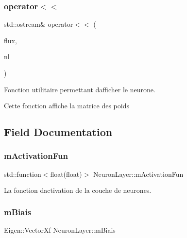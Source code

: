 \subsubsection{\texorpdfstring{operator$<$$<$}{operator<<}}
{\footnotesize\ttfamily std\+::ostream\& operator$<$$<$ (\begin{DoxyParamCaption}\item[{std\+::ostream \&}]{flux,  }\item[{\hyperlink{classNeuronLayer}{Neuron\+Layer}}]{nl }\end{DoxyParamCaption})\hspace{0.3cm}{\ttfamily [friend]}}



Fonction utilitaire permettant d\textquotesingle{}afficher le neurone. 

Cette fonction affiche la matrice des poids 

\subsection{Field Documentation}
\mbox{\label{classNeuronLayer_ac0ff52b79f1a068e75f0eb0309b5e683}} 
\subsubsection{\texorpdfstring{m\+Activation\+Fun}{mActivationFun}}
{\footnotesize\ttfamily std\+::function$<$float(float)$>$ Neuron\+Layer\+::m\+Activation\+Fun\hspace{0.3cm}{\ttfamily [private]}}



La fonction d\textquotesingle{}activation de la couche de neurones. 

\mbox{\label{classNeuronLayer_a6d1c0d70051d87dace0cdf654d866a4a}} 
\subsubsection{\texorpdfstring{m\+Biais}{mBiais}}
{\footnotesize\ttfamily Eigen\+::\+Vector\+Xf Neuron\+Layer\+::m\+Biais\hspace{0.3cm}{\ttfamily [private]}}



